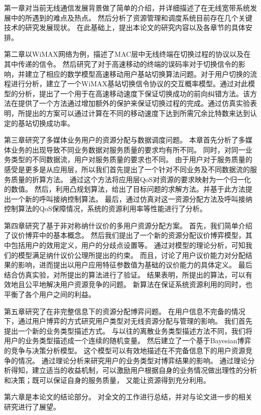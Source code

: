 第一章对当前无线通信发展背景做了简单的介绍，并详细描述了在无线宽带系统发展中的所遇到的难点及热点。
然后分析了资源管理和调度系统目前存在几个关键技术的研究发展现状。
在此基础上，提出本论文的研究内容以及各章节的具体安排。
\par %
第二章以WiMAX网络为例，描述了MAC层中无线终端在切换过程的协议以及在其中传递的信令。
然后研究了对于高速移动的终端的误码率对于切换信令的影响，并建立了相应的数学模型高速移动用户基站切换算法问题。对于用户切换的流程进行分析，建立了一个WiMAX基站切换信令协议的交互概率模型。通过对此模型的分析，提出了一个用于在高速移动速度下保证切换成功的前向纠错方法。该方法在提供了一个方法通过增加额外的保护来保证切换过程的完成。通过仿真实验表明，所提出的方案可以通过计算在不同的移动速度下达到所需冗余比特数来达到认定的基站切换成功率。

第三章研究了多媒体业务用户的资源分配与数据调度问题。
本章首先分析了多媒体业务的出现导致不同业务数据对服务质量的要求均有所不同。
同时，对同一业务类型的不同数据流，用户对服务质量的要求也不同。
由于用户对于服务质量的感受是更多是从应用层，所以我们首先提出了一个针对不同业务及不同数据流的服务质量的折算方法。
通过这个方法将应用层QoS对资源的要求映射为一个归一化的数值。
然后，利用凸规划算法，给出了目标问题的求解方法。并基于此方法提出一个新的呼叫接纳控制算法。
最后，通过仿真对这一资源分配方法及呼叫接纳控制算法的QoS保障情况，系统的资源利用率等性能进行了分析。


第四章研究了基于非对称纳什议价的多用户资源分配方案。
首先，我们简单介绍了议价博弈中的基本概念。
然后我们提出了一个新的资源分配议价博弈模型，其中包括用户的效用定义，用户的分歧点设置等。
通过对模型的理论分析，可知我们的模型满足纳什议价公理所提出的约束。
而且，讨论了用户议价能力对分配结果的影响，进而提出以用户应用特征参数值为基础的议价能力的具体定义。
最后结合仿真实验，对所提出的算法进行了验证。
结果表明，所提出的算法，可以有效地且公平地解决用户资源竞争的问题。
新算法在保证系统资源利用的同时，也平衡了各个用户之间的利益。

第五章研究了在非完整信息下的资源分配博弈问题。
在用户信息不完备的情况下，通过用户博弈的方式研究用户类型对无线资源分配与管理的影响。
我们首先提出一个新的业务类型描述方式。
与以往的离散业务类型描述方法不同，我们将用户的业务类型描述成一个连续的随机变量。
然后建立了一个基于Bayesian博弈的竞争与决策分析模型。
这个模型可以有效地描述在不完备信息下的用户资源竞争的情况。
通过理论分析来研究用户的业务类型对博弈结果的影响。
通过理论分析得知，建立适当的收益机制，可以激励用户根据自身的业务情况做出理性的分析和决策；既可以保证自身的服务质量，
又能让资源得到充分利用。

\par 第六章是本论文的结论部分。
对全文的工作进行总结，并对与论文进一步的相关研究进行了展望。
